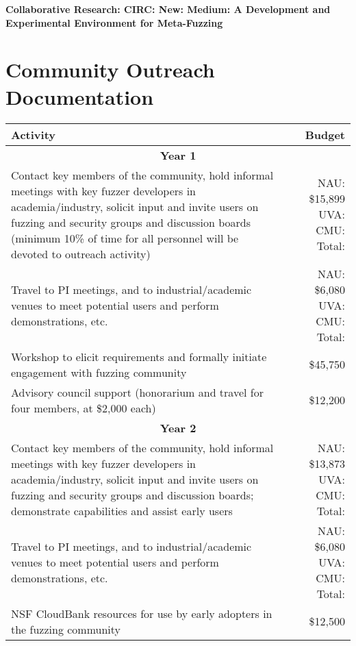 \documentclass[12pt]{article}
\begin{document}
\begin{center} {\Large\sf\textbf{Collaborative Research: CIRC: New: Medium: A
      Development and Experimental Environment for Meta-Fuzzing}}
\end{center}

\section*{Community Outreach Documentation}


\begin{table}
  \begin{tabular}{|p{12cm}|r|}
    \hline
    {\bf Activity} & {\bf Budget} \\
    \hline 
    \multicolumn{2}{c}{{\bf Year 1}} \\
    \hline
    Contact key members of the community, hold informal meetings with
    key fuzzer developers in academia/industry, solicit input and
    invite users
    on fuzzing and security groups and discussion boards (minimum 10\% of time for all
    personnel will be devoted to outreach activity) &  NAU: \$15,899 UVA: CMU:
                                                      Total:  \\
    \hline
    Travel to PI meetings, and to industrial/academic venues to meet
    potential users and perform demonstrations, etc. & NAU: \$6,080 UVA: CMU: Total:\\
    \hline
    Workshop to elicit requirements and formally initiate engagement
    with fuzzing community & \$45,750 \\
    \hline 
    Advisory council support (honorarium and travel for four members, 
    at \$2,000 each) & \$12,200 \\
    \hline
    \hline
    \multicolumn{2}{c}{{\bf Year 2}} \\
    \hline
    \hline
    Contact key members of the community, hold informal meetings with
    key fuzzer developers in academia/industry, solicit input and
    invite users
    on fuzzing and security groups and discussion boards; demonstrate
    capabilities and assist early users&  NAU:  \$13,873 UVA: CMU:
                                                      Total:  \\
    \hline
    Travel to PI meetings, and to industrial/academic venues to meet
    potential users and perform demonstrations, etc. & NAU: \$6,080 UVA: CMU: Total:\\
    \hline
    NSF CloudBank resources for use by early adopters in the fuzzing 
    community & \$12,500 \\

\end{tabular}
\end{table}
\end{document}
